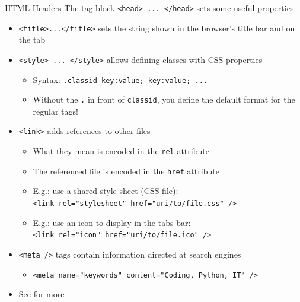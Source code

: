 \begin{frame}{HTML Headers}
%
The tag block \texttt{<head> ... </head>} sets some useful properties
\pause
\begin{itemize}
\item \texttt{<title>...</title>} sets the string shown in the browser's title bar and on the tab
\pause
\item \texttt{<style> ... </style>} allows defining classes with CSS properties
	\begin{itemize}
	\item Syntax: \texttt{.classid {key:value; key:value; ...}}
	\item Without the \texttt{.} in front of \texttt{classid}, you define the default format for the regular tags!
	\end{itemize}
\pause
\item \texttt{<link>} adds references to other files
	\begin{itemize}
	\item What they mean is encoded in the \texttt{rel} attribute
	\item The referenced file is encoded in the \texttt{href} attribute
	\item E.\;g.: use a shared style sheet (CSS file):\\
		\texttt{<link rel="stylesheet" href="uri/to/file.css" />}
	\item E.\;g.: use an icon to display in the tabs bar:\\
		\texttt{<link rel="icon" href="uri/to/file.ico" />}
	\end{itemize}
\pause
\item \texttt{<meta />} tags contain information directed at search engines
	\begin{itemize}
	\item \texttt{<meta name="keywords" content="Coding, Python, IT" />}
	\end{itemize}
\pause
\item See  for more
\end{itemize}
%
\end{frame}


